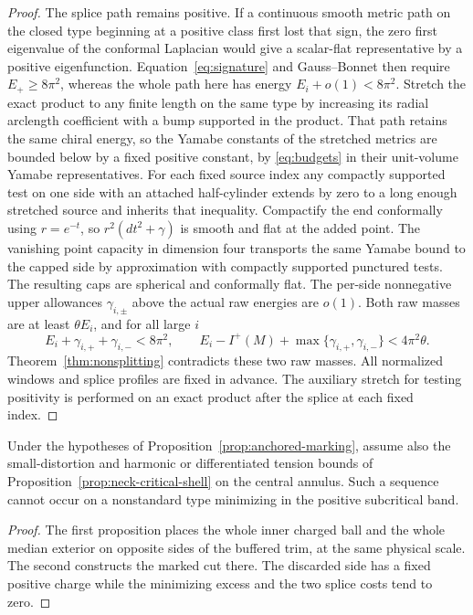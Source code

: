 \begin{proof}
The splice path remains positive. If a continuous smooth metric
path on the closed type beginning at a positive class first lost
that sign, the zero first eigenvalue of the conformal Laplacian
would give a scalar-flat representative by a positive
eigenfunction. Equation~\eqref{eq:signature} and Gauss--Bonnet
then require \(E_+\ge8\pi^2\), whereas the whole path here has
energy \(E_i+o(1)<8\pi^2\). Stretch the exact product to any
finite length on the same type by increasing its radial arclength
coefficient with a bump supported in the product. That path retains
the same chiral energy, so the Yamabe constants of the stretched
metrics are bounded below by a fixed positive constant, by
\eqref{eq:budgets} in their unit-volume Yamabe representatives.
For each fixed source index any compactly supported test on one
side with an attached half-cylinder extends by zero to a long enough
stretched source and inherits that inequality. Compactify the end
conformally using \(r=e^{-t}\), so \(r^2(dt^2+\gamma)\) is smooth
and flat at the added point. The vanishing point capacity in
dimension four transports the same Yamabe bound to the capped
side by approximation with compactly supported punctured tests.
The resulting caps are spherical and conformally flat. The
per-side nonnegative upper allowances \(\gamma_{i,\pm}\) above the
actual raw energies are \(o(1)\). Both raw masses are at least
\(\theta E_i\), and for all large \(i\)
\[
 E_i+\gamma_{i,+}+\gamma_{i,-}<8\pi^2,\qquad
 E_i-I^+(M)+\max\{\gamma_{i,+},\gamma_{i,-}\}<4\pi^2\theta .
\]
Theorem~\ref{thm:nonsplitting} contradicts these two raw masses.
All normalized windows and splice profiles are fixed in advance.
The auxiliary stretch for testing positivity is performed on an
exact product after the splice at each fixed index.
\end{proof}

\begin{corollary}
\label{cor:anchored-annulus}
Under the hypotheses of Proposition~\ref{prop:anchored-marking}, assume
also the small-distortion and harmonic or differentiated tension bounds
of Proposition~\ref{prop:neck-critical-shell} on the central annulus.
Such a sequence cannot occur on a nonstandard type minimizing in the
positive subcritical band.
\end{corollary}
\begin{proof}
The first proposition places the whole inner charged ball and the
whole median exterior on opposite sides of the buffered trim, at the
same physical scale. The second constructs the marked cut there.
The discarded side has a fixed positive charge while the minimizing
excess and the two splice costs tend to zero.
\end{proof}
